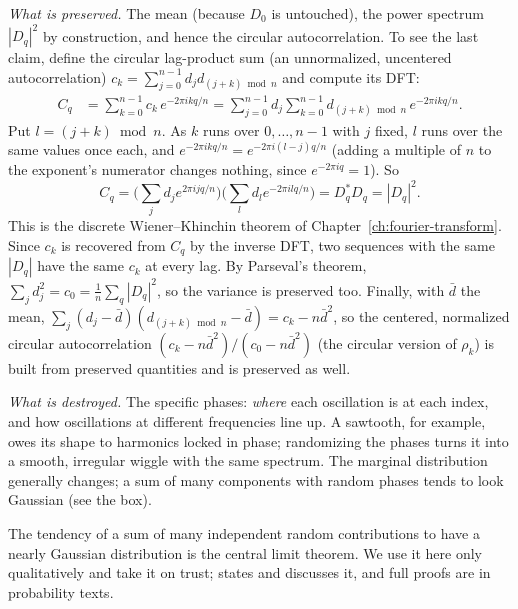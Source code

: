 \emph{What is preserved.} The mean (because $D_0$ is untouched), the power spectrum $|D_q|^2$ by construction, and hence the circular autocorrelation. To see the last claim, define the circular lag-product sum (an unnormalized, uncentered autocorrelation) $c_k=\sum_{j=0}^{n-1}d_jd_{(j+k)\bmod n}$ and compute its DFT:
\begin{align}
C_q&=\sum_{k=0}^{n-1}c_k\,e^{-2\pi ikq/n}=\sum_{j=0}^{n-1}d_j\sum_{k=0}^{n-1}d_{(j+k)\bmod n}\,e^{-2\pi ikq/n}.
\end{align}
Put $l=(j+k)\bmod n$. As $k$ runs over $0,\dots,n-1$ with $j$ fixed, $l$ runs over the same values once each, and $e^{-2\pi ikq/n}=e^{-2\pi i(l-j)q/n}$ (adding a multiple of $n$ to the exponent's numerator changes nothing, since $e^{-2\pi i q}=1$). So
\begin{equation}
C_q=\Big(\sum_{j}d_je^{2\pi ijq/n}\Big)\Big(\sum_{l}d_le^{-2\pi ilq/n}\Big)=D_q^*D_q=|D_q|^2 .
\label{eq:controls-wk}
\end{equation}
This is the discrete Wiener--Khinchin theorem of Chapter~\ref{ch:fourier-transform}. Since $c_k$ is recovered from $C_q$ by the inverse DFT, two sequences with the same $|D_q|$ have the same $c_k$ at every lag. By Parseval's theorem, $\sum_jd_j^2=c_0=\frac1n\sum_q|D_q|^2$, so the variance is preserved too. Finally, with $\bar d$ the mean, $\sum_j(d_j-\bar d)(d_{(j+k)\bmod n}-\bar d)=c_k-n\bar d^2$, so the centered, normalized circular autocorrelation $(c_k-n\bar d^2)/(c_0-n\bar d^2)$ (the circular version of $\rho_k$) is built from preserved quantities and is preserved as well.

\emph{What is destroyed.} The specific phases: \emph{where} each oscillation is at each index, and how oscillations at different frequencies line up. A sawtooth, for example, owes its shape to harmonics locked in phase; randomizing the phases turns it into a smooth, irregular wiggle with the same spectrum. The marginal distribution generally changes; a sum of many components with random phases tends to look Gaussian (see the box).
\begin{beyond}
The tendency of a sum of many independent random contributions to have a nearly Gaussian distribution is the central limit theorem. We use it here only qualitatively and take it on trust; \cite{rhb} states and discusses it, and full proofs are in probability texts.
\end{beyond}

